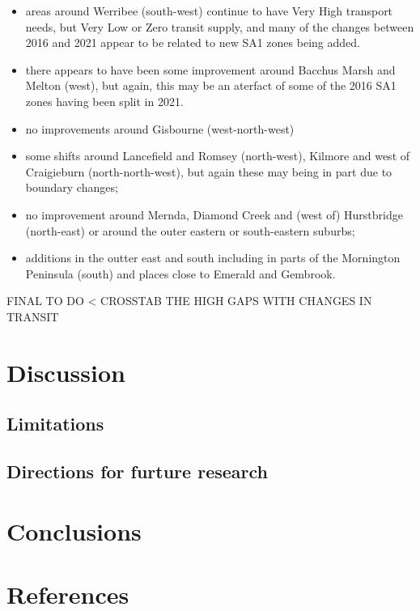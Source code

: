 \documentclass[preprint, 3p,
authoryear]{elsarticle} %
\providecommand{\tightlist}{%
  \setlength{\itemsep}{0pt}\setlength{\parskip}{0pt}}
\begin{document}
\begin{itemize}
\tightlist
\item
  areas around Werribee (south-west) continue to have Very High
  transport needs, but Very Low or Zero transit supply, and many of the
  changes between 2016 and 2021 appear to be related to new SA1 zones
  being added.
\item
  there appears to have been some improvement around Bacchus Marsh and
  Melton (west), but again, this may be an aterfact of some of the 2016
  SA1 zones having been split in 2021.\\
\item
  no improvements around Gisbourne (west-north-west)
\item
  some shifts around Lancefield and Romsey (north-west), Kilmore and
  west of Craigieburn (north-north-west), but again these may being in
  part due to boundary changes;
\item
  no improvement around Mernda, Diamond Creek and (west of) Hurstbridge
  (north-east) or around the outer eastern or south-eastern suburbs;
\item
  additions in the outter east and south including in parts of the
  Mornington Peninsula (south) and places close to Emerald and Gembrook.
\end{itemize}

FINAL TO DO \textless{} CROSSTAB THE HIGH GAPS WITH CHANGES IN TRANSIT

\section{Discussion}\label{discussion}

\subsection{Limitations}\label{limitations}

\subsection{Directions for furture
research}\label{directions-for-furture-research}

\section{Conclusions}\label{conclusions}

\section*{References}\label{references}
\end{document}
